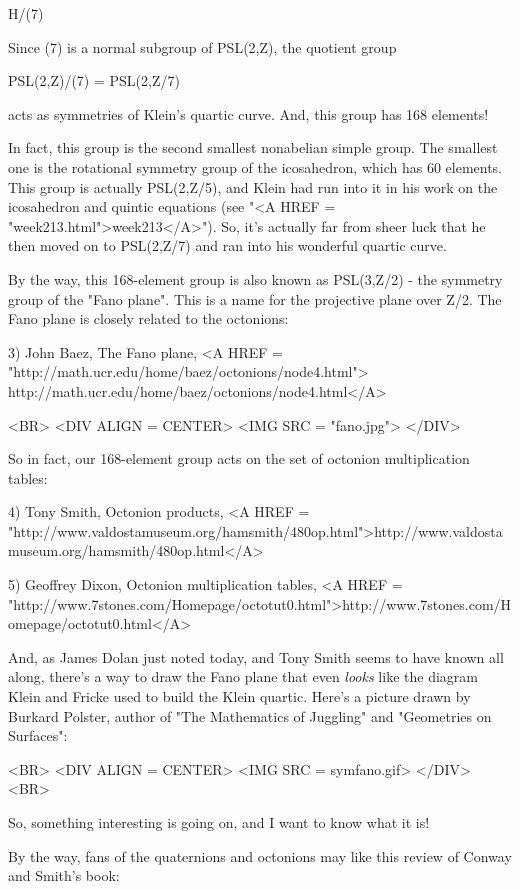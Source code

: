 H/\Gamma (7)

Since \Gamma (7) is a normal subgroup of PSL(2,Z), the quotient
group 

PSL(2,Z)/\Gamma (7) = PSL(2,Z/7) 

acts as symmetries of Klein's quartic curve.  And, this group has
168 elements!  

In fact, this group is the second smallest nonabelian simple group.
The smallest one is the rotational symmetry group of the icosahedron,
which has 60 elements.  This group is actually PSL(2,Z/5), and
Klein had run into it in his work on the icosahedron and 
quintic equations (see "<A HREF = "week213.html">week213</A>").  
So, it's actually far from 
sheer luck that he then moved on to PSL(2,Z/7) and ran into his 
wonderful quartic curve.

By the way, this 168-element group is also known as PSL(3,Z/2) - 
the symmetry group of the "Fano plane".  This is a name for the 
projective plane over Z/2.  The Fano plane is closely related to 
the octonions:

3) John Baez, The Fano plane,
<A HREF = "http://math.ucr.edu/home/baez/octonions/node4.html">
http://math.ucr.edu/home/baez/octonions/node4.html</A>

<BR>
<DIV ALIGN = CENTER>
<IMG SRC = "fano.jpg">
</DIV>


So in fact, our 168-element group acts on the set of octonion
multiplication tables:

4) Tony Smith, Octonion products,
<A HREF = "http://www.valdostamuseum.org/hamsmith/480op.html">http://www.valdostamuseum.org/hamsmith/480op.html</A>

5) Geoffrey Dixon, Octonion multiplication tables,
<A HREF = "http://www.7stones.com/Homepage/octotut0.html">http://www.7stones.com/Homepage/octotut0.html</A>

And, as James Dolan just noted today, and Tony Smith seems to have known
all along, there's a way to draw the Fano plane that even \emph{looks} like 
the diagram Klein and Fricke used to build the Klein quartic.  Here's
a picture drawn by Burkard Polster, author of "The Mathematics
of Juggling" and "Geometries on Surfaces":

<BR>
<DIV ALIGN = CENTER>
<IMG SRC = symfano.gif>
</DIV>
<BR>

So, something interesting is going on, and I want to know what it is!

By the way, fans of the quaternions and octonions may like this
review of Conway and Smith's book:

